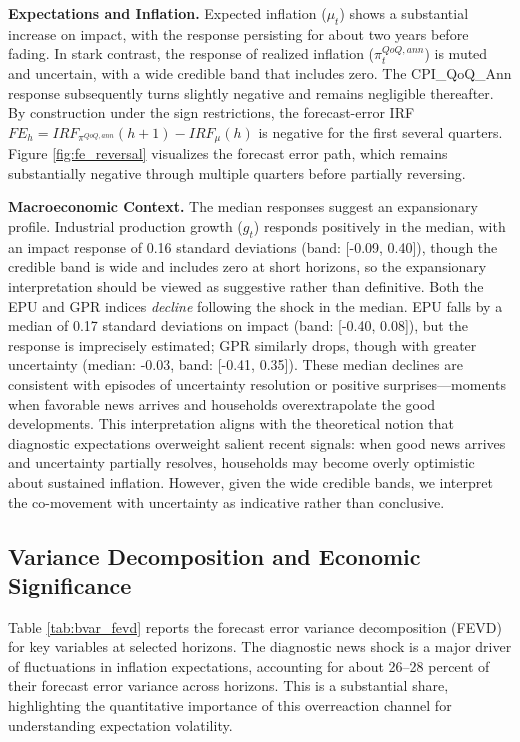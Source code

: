 \documentclass[12pt]{article}
\begin{document}
\textbf{Expectations and Inflation.} Expected inflation ($\mu_t$) shows a substantial increase on impact, with the response persisting for about two years before fading. In stark contrast, the response of realized inflation ($\pi^{QoQ,ann}_t$) is muted and uncertain, with a wide credible band that includes zero. The CPI\_QoQ\_Ann response subsequently turns slightly negative and remains negligible thereafter. By construction under the sign restrictions, the forecast-error IRF $FE_h = IRF_{\pi^{QoQ,ann}}(h+1) - IRF_{\mu}(h)$ is negative for the first several quarters. Figure \ref{fig:fe_reversal} visualizes the forecast error path, which remains substantially negative through multiple quarters before partially reversing.

\textbf{Macroeconomic Context.} The median responses suggest an expansionary profile. Industrial production growth ($g_t$) responds positively in the median, with an impact response of 0.16 standard deviations (band: [-0.09, 0.40]), though the credible band is wide and includes zero at short horizons, so the expansionary interpretation should be viewed as suggestive rather than definitive. Both the EPU and GPR indices \emph{decline} following the shock in the median. EPU falls by a median of 0.17 standard deviations on impact (band: [-0.40, 0.08]), but the response is imprecisely estimated; GPR similarly drops, though with greater uncertainty (median: -0.03, band: [-0.41, 0.35]). These median declines are consistent with episodes of uncertainty resolution or positive surprises—moments when favorable news arrives and households overextrapolate the good developments. This interpretation aligns with the theoretical notion that diagnostic expectations overweight salient recent signals: when good news arrives and uncertainty partially resolves, households may become overly optimistic about sustained inflation. However, given the wide credible bands, we interpret the co-movement with uncertainty as indicative rather than conclusive.

\subsection{Variance Decomposition and Economic Significance}
Table \ref{tab:bvar_fevd} reports the forecast error variance decomposition (FEVD) for key variables at selected horizons. The diagnostic news shock is a major driver of fluctuations in inflation expectations, accounting for about 26--28 percent of their forecast error variance across horizons. This is a substantial share, highlighting the quantitative importance of this overreaction channel for understanding expectation volatility.
\end{document}
